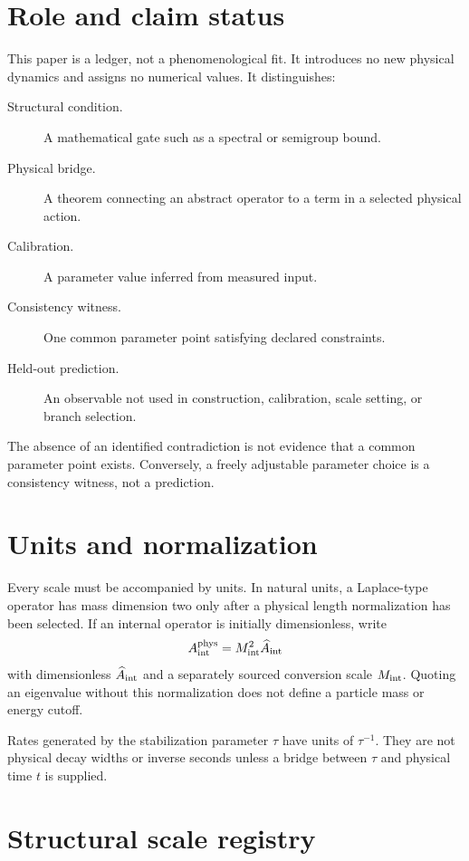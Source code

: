 \documentclass[11pt]{article}
\begin{document}
\tableofcontents

\section{Role and claim status}

This paper is a ledger, not a phenomenological fit. It introduces no new
physical dynamics and assigns no numerical values. It distinguishes:
\begin{description}
\item[Structural condition.] A mathematical gate such as a spectral or
semigroup bound.
\item[Physical bridge.] A theorem connecting an abstract operator to a term in
a selected physical action.
\item[Calibration.] A parameter value inferred from measured input.
\item[Consistency witness.] One common parameter point satisfying declared
constraints.
\item[Held-out prediction.] An observable not used in construction,
calibration, scale setting, or branch selection.
\end{description}

The absence of an identified contradiction is not evidence that a common
parameter point exists. Conversely, a freely adjustable parameter choice is a
consistency witness, not a prediction.

\section{Units and normalization}

Every scale must be accompanied by units. In natural units, a Laplace-type
operator has mass dimension two only after a physical length normalization has
been selected. If an internal operator is initially dimensionless, write
\[
 A_{\rm int}^{\rm phys}=M_{\rm int}^2\widehat A_{\rm int}
\]
with dimensionless $\widehat A_{\rm int}$ and a separately sourced conversion
scale $M_{\rm int}$. Quoting an eigenvalue without this normalization does not
define a particle mass or energy cutoff.

Rates generated by the stabilization parameter $\tau$ have units of
$\tau^{-1}$. They are not physical decay widths or inverse seconds unless a
bridge between $\tau$ and physical time $t$ is supplied.

\section{Structural scale registry}
\end{document}
